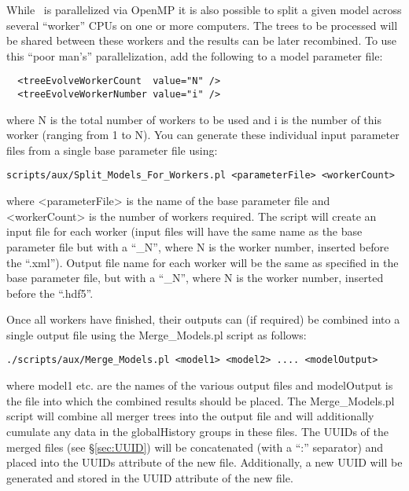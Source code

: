 While \glc\ is parallelized via OpenMP it is also possible to split a given model across several ``worker'' CPUs on one or more computers. The trees to be processed will be shared between these workers and the results can be later recombined. To use this ``poor man's'' parallelization, add the following to a model parameter file:
\begin{verbatim}
  <treeEvolveWorkerCount  value="N" />
  <treeEvolveWorkerNumber value="i" />
\end{verbatim}
where {\normalfont \ttfamily N} is the total number of workers to be used and {\normalfont \ttfamily i} is the number of this worker (ranging from 1 to {\normalfont \ttfamily N}). You can generate these individual input parameter files from a single base parameter file using:
\begin{verbatim}
scripts/aux/Split_Models_For_Workers.pl <parameterFile> <workerCount>
\end{verbatim}
where {\normalfont \ttfamily <parameterFile>} is the name of the base parameter file and {\normalfont \ttfamily <workerCount>} is the number of workers required. The script will create an input file for each worker (input files will have the same name as the base parameter file but with a ``{\normalfont \ttfamily \_N}'', where {\normalfont \ttfamily N} is the worker number, inserted before the ``{\normalfont \ttfamily .xml}''). Output file name for each worker will be the same as specified in the base parameter file, but with a ``{\normalfont \ttfamily \_N}'', where {\normalfont \ttfamily N} is the worker number, inserted before the ``{\normalfont \ttfamily .hdf5}''.

Once all workers have finished, their outputs can (if required) be combined into a single output file using the {\normalfont \ttfamily Merge\_Models.pl} script as follows:
\begin{verbatim}
./scripts/aux/Merge_Models.pl <model1> <model2> .... <modelOutput>
\end{verbatim}
where {\normalfont \ttfamily model1} etc. are the names of the various output files and {\normalfont \ttfamily modelOutput} is the file into which the combined results should be placed. The {\normalfont \ttfamily Merge\_Models.pl} script will combine all merger trees into the output file and will additionally cumulate any data in the {\normalfont \ttfamily globalHistory} groups in these files. The UUIDs of the merged files (see \S\ref{sec:UUID}) will be concatenated (with a ``:'' separator) and placed into the {\normalfont \ttfamily UUIDs} attribute of the new file. Additionally, a new UUID will be generated and stored in the {\normalfont \ttfamily UUID} attribute of the new file.

